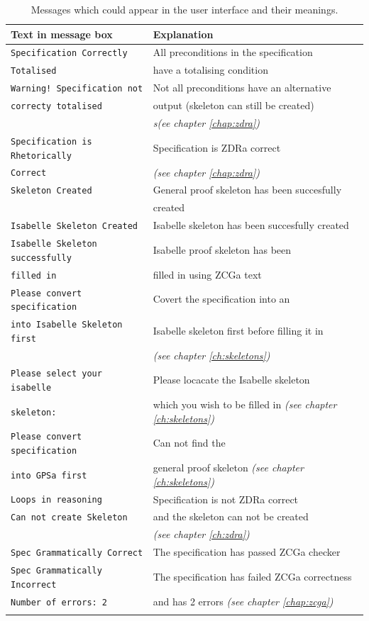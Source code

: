 {\def\arraystretch{0.5}\tabcolsep=0.5pt
\begin{longtable}[H]{|l | l |}
\hline
\textbf{Text in message box} & \textbf{Explanation} \\
\hline
\hline
\verb|Specification Correctly| & All preconditions in the specification\\
\verb|Totalised| & have a totalising condition  \\
\hline
\verb|Warning! Specification not| & Not all preconditions have an alternative \\
\verb|correcty totalised| & output (skeleton can still be created) \\
& \textit{s(ee chapter \ref{chap:zdra})} \\
\hline
\verb|Specification is Rhetorically| & Specification is ZDRa correct \\
\verb|Correct| & \textit{(see chapter \ref{chap:zdra})} \\
\hline
\verb|Skeleton Created| & General proof skeleton has been succesfully \\
& created \\
\hline
\verb|Isabelle Skeleton Created| & Isabelle skeleton has been succesfully created \\
\hline
\verb|Isabelle Skeleton successfully| & Isabelle proof skeleton has been \\
\verb|filled in| & filled in using ZCGa text \\
\hline
\verb|Please convert specification| & Covert the specification into an  \\
\verb|into Isabelle Skeleton first| & Isabelle skeleton first before filling it in \\
& \textit{(see chapter \ref{ch:skeletons})} \\
\hline
\verb|Please select your isabelle| & Please locacate the Isabelle skeleton\\
\verb|skeleton:| & which you wish to be filled in \textit{(see chapter \ref{ch:skeletons})}\\
\hline
\verb|Please convert specification| & Can not find the \\
\verb|into GPSa first| & general proof skeleton \textit{(see chapter \ref{ch:skeletons})}\\
\hline
\verb|Loops in reasoning| & Specification is not ZDRa correct \\
\verb|Can not create Skeleton| & and the skeleton can not be created \\
& \textit{(see chapter \ref{ch:zdra})}\\
\hline
\verb|Spec Grammatically Correct| & The specification has passed ZCGa checker \\
\hline
\verb|Spec Grammatically Incorrect|& The specification has failed ZCGa correctness\\
\verb|Number of errors: 2| & and has 2 errors \textit{(see chapter \ref{chap:zcga})}\\
\hline
\caption{Messages which could appear in the user interface and their meanings.}
\label{tab:uimessages}
\end{longtable}
}

